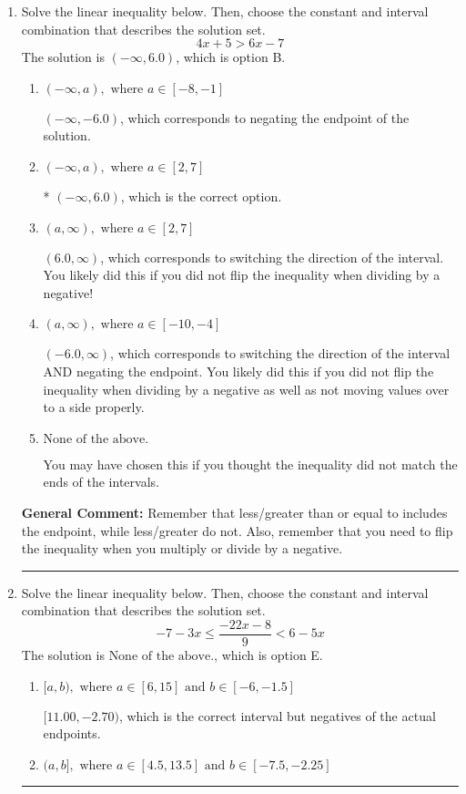 \documentclass{extbook}[14pt]
\newcommand{\litem}[1]{\item #1

\rule{\textwidth}{0.4pt}}
\begin{document}
\begin{enumerate}\litem{
Solve the linear inequality below. Then, choose the constant and interval combination that describes the solution set.
\[ 4x + 5 > 6x -7 \]The solution is \( (-\infty, 6.0) \), which is option B.\begin{enumerate}[label=\Alph*.]
\item \( (-\infty, a), \text{ where } a \in [-8, -1] \)

 $(-\infty, -6.0)$, which corresponds to negating the endpoint of the solution.
\item \( (-\infty, a), \text{ where } a \in [2, 7] \)

* $(-\infty, 6.0)$, which is the correct option.
\item \( (a, \infty), \text{ where } a \in [2, 7] \)

 $(6.0, \infty)$, which corresponds to switching the direction of the interval. You likely did this if you did not flip the inequality when dividing by a negative!
\item \( (a, \infty), \text{ where } a \in [-10, -4] \)

 $(-6.0, \infty)$, which corresponds to switching the direction of the interval AND negating the endpoint. You likely did this if you did not flip the inequality when dividing by a negative as well as not moving values over to a side properly.
\item \( \text{None of the above}. \)

You may have chosen this if you thought the inequality did not match the ends of the intervals.
\end{enumerate}

\textbf{General Comment:} Remember that less/greater than or equal to includes the endpoint, while less/greater do not. Also, remember that you need to flip the inequality when you multiply or divide by a negative.
}
\litem{
Solve the linear inequality below. Then, choose the constant and interval combination that describes the solution set.
\[ -7 - 3 x \leq \frac{-22 x - 8}{9} < 6 - 5 x \]The solution is \( \text{None of the above.} \), which is option E.\begin{enumerate}[label=\Alph*.]
\item \( [a, b), \text{ where } a \in [6, 15] \text{ and } b \in [-6, -1.5] \)

$[11.00, -2.70)$, which is the correct interval but negatives of the actual endpoints.
\item \( (a, b], \text{ where } a \in [4.5, 13.5] \text{ and } b \in [-7.5, -2.25] \)


\end{enumerate}}
\end{enumerate}
\end{document}
